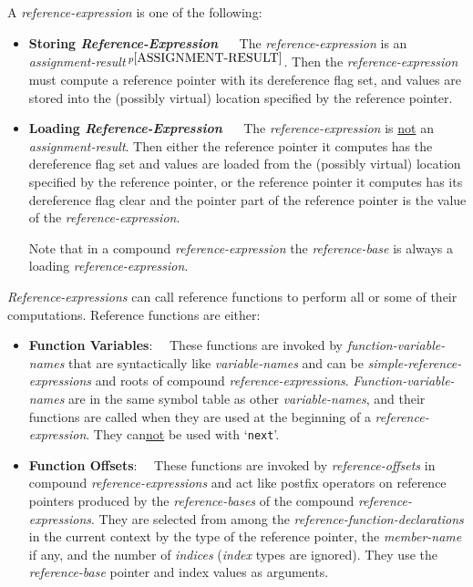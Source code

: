 \documentclass[12pt]{article}
\newcommand{\key}[1]{{\rm \bfseries #1}}
\newcommand{\pagnote}[1]{$\,^{p\pageref{#1}}$}
\begin{document}
A {\em reference-expression} is one of the following:
\begin{itemize}
\item \key{Storing {\em Reference-Expression}} ~~
The {\em reference-expression} is an
{\em assignment-re\-sult}\pagnote{ASSIGNMENT-RESULT}.
Then the {\em reference-expression} must compute a reference pointer with its
dereference flag set, and values
are stored into the (possibly virtual)
location specified by the reference pointer.
\item \key{Loading {\em Reference-Expression}} ~~
The {\em reference-expression} is \underline{not} an
{\em assignment-result}.
Then either the reference pointer it computes has the
dereference flag set and values are loaded from the
(possibly virtual) location specified by the reference pointer,
or the reference pointer it computes
has its dereference flag clear and the pointer part of the reference pointer
is the value of the {\em reference-expression}.

Note that in a compound {\em reference-expression} the {\em reference-base}
is always a loading {\em reference-expression}.
\end{itemize}

{\em Reference-expressions} can call reference functions to perform
all or some of their computations.  Reference functions are either:
\begin{itemize}
\item\key{Function Variables}:~~
These functions
are invoked by {\em function-variable-names} that are syntactically
like {\em variable-names} and can be {\em simple-reference-expressions} and
roots of compound {\em reference-expressions}.
{\em Function-variable-names} are in the same symbol table as
other {\em variable-names}, and their functions are called when they are
used at the beginning
of a {\em reference-expression}.  They can\underline{not}
be used with `{\tt next}'.

\item\key{Function Offsets}:~~
These functions are invoked by {\em reference-offsets} in
compound {\em reference-expressions}
and act like postfix operators on
reference pointers produced by the {\em reference-bases} of the
compound {\em reference-expressions}.
They are selected from among the {\em reference-function-declarations}
in the current context by the type of the reference pointer,
the {\em member-name} if any, and the number of {\em indices} ({\em index}
types are ignored).
They use the {\em reference-base} pointer and index values as arguments.
\end{itemize}
\end{document}
